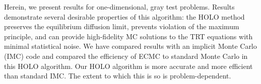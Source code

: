 Herein, we present results for one-dimensional, gray test problems.  Results demonstrate
several desirable properties of this algorithm: the HOLO method preserves the equilibrium diffusion limit, prevents violation
of the maximum principle, and can provide high-fidelity MC solutions to the TRT equations
with minimal statistical noise.  We have compared results with an implicit Monte Carlo
(IMC) code and compared the efficiency of ECMC to standard Monte Carlo in this HOLO
algorithm.  Our HOLO algorithm is more accurate and more efficient than standard IMC.  The
extent to which this is so is problem-dependent.

\pagebreak{}
